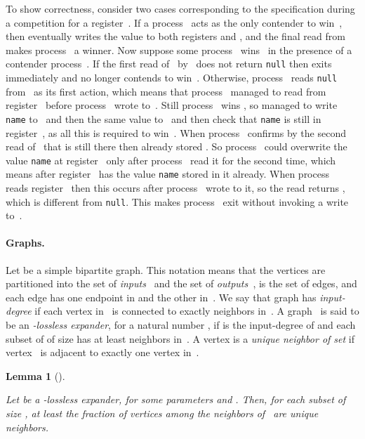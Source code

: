\documentclass[11pt]{article}
\newcommand{\BBB}{\vspace*{-\bigskipamount}}
\newcommand{\Paragraph}[1]{\BBB\paragraph{#1}}
\newcommand{\qed}{\hfill  \smallbreak}
\newenvironment{proof}{\noindent{\bf Proof:}}{\qed}
\newtheorem{lemma}{Lemma}
\begin{document}
\begin{proof} 
To show correctness, consider two cases corresponding to the specification during a competition for a register~.
If a process~ acts as the only contender to win~, then   eventually writes the value  to both registers  and , and the final  read from  makes process~ a winner.
Now suppose some process~ wins~ in the presence of a contender process~.
If the first read of~ by~ does not return \texttt{null}  then  exits immediately and no longer contends to win~. 
Otherwise, process~ reads \texttt{null} from~ as its first action, which means that  process~ managed to read from register~ before process~ wrote to~.
Still process~ wins , so  managed to write \texttt{name} to~ and then the same value to~ and then check that \texttt{name} is still in register~, as all this is required to win~.
When process~ confirms by the second read of~ that  is still there then  already stored .
So process~ could overwrite the value \texttt{name} at register~ only after process~ read it for the second time, which means after register~ has the value \texttt{name} stored in it already.
When process~ reads register~ then this occurs after process~ wrote  to it, so the read returns , which is different from \texttt{null}. 
This makes process~ exit without invoking a write to~.
\end{proof} 




\Paragraph{Graphs.}



Let  be a simple bipartite graph.
This notation means that the vertices are partitioned into the set of \emph{inputs~}  and the set of \emph{outputs~},  is the set of edges, and each edge has one endpoint in  and the other in~.
We say that graph  has \emph{input-degree } if each vertex in~ is connected to exactly  neighbors in~. 
A graph~ is said to be an \emph{-lossless expander}, for a natural number , if  is the input-degree of  and each subset  of  of size  has at least  neighbors in~.
A vertex  is a \emph{unique neighbor of set } if vertex~ is adjacent to exactly one vertex in~.



\begin{lemma}[\cite{CapalboRVW02}]
\label{lem:from-CapalboRVW02}

Let  be a -lossless expander, for some parameters  and .
Then, for each subset  of size , at least the fraction  of vertices among the neighbors of~ are unique neighbors.
\end{lemma}
\end{document}
